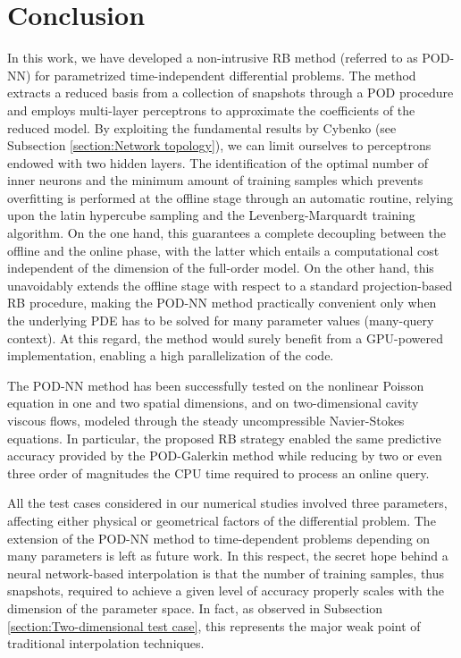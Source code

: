 \documentclass{elsarticle}
\numberwithin{equation}{section}
\theoremstyle{theorem}
\theoremstyle{definition}
\theoremstyle{remark}
\theoremstyle{proposition}
\numberwithin{figure}{section}
\begin{document}
	
	
	\section{Conclusion}
	\label{section:Conclusion}	
	
		In this work, we have developed a non-intrusive RB method (referred to as POD-NN) for parametrized time-independent differential problems. The method extracts a reduced basis from a collection of snapshots through a POD procedure and employs multi-layer perceptrons to approximate the coefficients of the reduced model. By exploiting the fundamental results by Cybenko (see Subsection \ref{section:Network topology}), we can limit ourselves to perceptrons endowed with two hidden layers. The identification of the optimal number of inner neurons and the minimum amount of training samples which prevents overfitting is performed at the offline stage through an automatic routine, relying upon the latin hypercube sampling and the Levenberg-Marquardt training algorithm. On the one hand, this guarantees a complete decoupling between the offline and the online phase, with the latter which entails a computational cost independent of the dimension of the full-order model. On the other hand, this unavoidably extends the offline stage with respect to a standard projection-based RB procedure, making the POD-NN method practically convenient only when the underlying PDE has to be solved for many parameter values (many-query context). At this regard, the method would surely benefit from a GPU-powered implementation, enabling a high parallelization of the code.
		
		The POD-NN method has been successfully tested on the nonlinear Poisson equation in one and two spatial dimensions, and on two-dimensional cavity viscous flows, modeled through the steady uncompressible Navier-Stokes equations. In particular, the proposed RB strategy enabled the same predictive accuracy provided by the POD-Galerkin method while reducing by two or even three order of magnitudes the CPU time required to process an online query. %
		
		All the test cases considered in our numerical studies involved three parameters, affecting either physical or geometrical factors of the differential problem. The extension of the POD-NN method to time-dependent problems depending on many parameters is left as future work. In this respect, the secret hope behind a neural network-based interpolation is that the number of training samples, thus snapshots, required to achieve a given level of accuracy properly scales with the dimension of the parameter space. In fact, as observed in Subsection \ref{section:Two-dimensional test case}, this represents the major weak point of traditional interpolation techniques.
		
\end{document}

